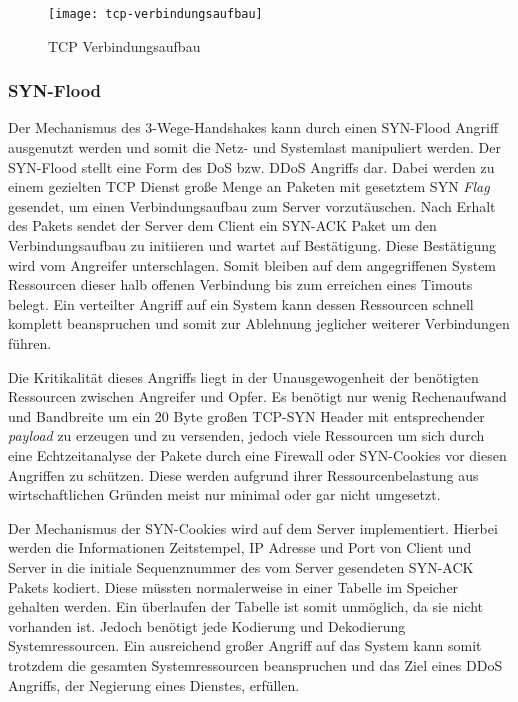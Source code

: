 \begin{figure}[h]
    \centering
    \texttt{[image: tcp-verbindungsaufbau]}
    \caption{TCP Verbindungsaufbau}
    \label{Analyse:TCP Verbindungsaufbau}
  \end{figure}
  
\clearpage

\subsubsection{SYN-Flood}
Der Mechanismus des 3-Wege-Handshakes kann durch einen SYN-Flood Angriff ausgenutzt werden und somit die Netz- und Systemlast manipuliert werden. Der SYN-Flood stellt eine Form des \ac{DoS} bzw. \ac{DDoS} Angriffs dar. Dabei werden zu einem gezielten \ac{TCP} Dienst große Menge an Paketen mit gesetztem SYN \textit{Flag} gesendet, um einen Verbindungsaufbau zum Server vorzutäuschen. Nach Erhalt des Pakets sendet der Server dem Client ein SYN-ACK Paket um den Verbindungsaufbau zu initiieren und wartet auf Bestätigung. Diese Bestätigung wird vom Angreifer unterschlagen. Somit bleiben auf dem angegriffenen System Ressourcen dieser halb offenen Verbindung bis zum erreichen eines Timouts belegt. Ein verteilter Angriff auf ein System kann dessen Ressourcen schnell komplett beanspruchen und somit zur Ablehnung jeglicher weiterer Verbindungen führen.

Die Kritikalität dieses Angriffs liegt in der Unausgewogenheit der benötigten Ressourcen zwischen Angreifer und Opfer. Es benötigt nur wenig Rechenaufwand und Bandbreite um ein 20 Byte großen \ac{TCP}-SYN Header mit entsprechender \textit{payload} zu erzeugen und zu versenden, jedoch viele Ressourcen um sich durch eine Echtzeitanalyse der Pakete durch eine Firewall oder SYN-Cookies vor diesen Angriffen zu schützen. Diese werden aufgrund ihrer Ressourcenbelastung aus wirtschaftlichen Gründen meist nur minimal oder gar nicht umgesetzt.

Der Mechanismus der SYN-Cookies wird auf dem Server implementiert. Hierbei werden die Informationen Zeitstempel, \ac{IP} Adresse und Port von Client und Server in die initiale Sequenznummer des vom Server gesendeten SYN-ACK Pakets kodiert. Diese müssten normalerweise in einer Tabelle im Speicher gehalten werden. Ein überlaufen der Tabelle ist somit unmöglich, da sie nicht vorhanden ist. Jedoch benötigt jede Kodierung und Dekodierung Systemressourcen. Ein ausreichend großer Angriff auf das System kann somit trotzdem die gesamten Systemressourcen beanspruchen und das Ziel eines \ac{DDoS} Angriffs, der Negierung eines Dienstes, erfüllen.

